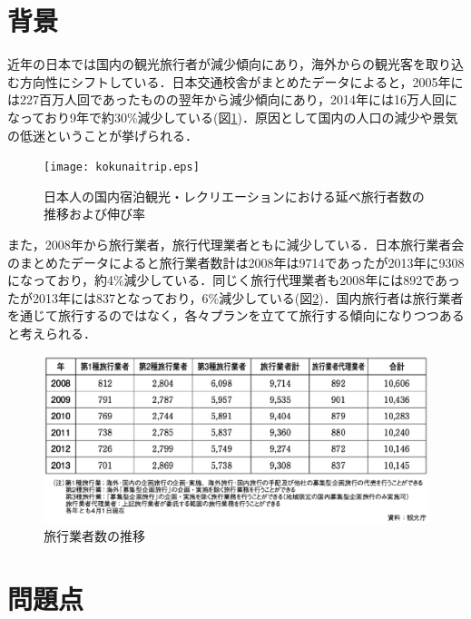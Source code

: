 \documentclass{funthesis}
\begin{document}

\section{背景}
近年の日本では国内の観光旅行者が減少傾向にあり，海外からの観光客を取り込む方向性にシフトしている．日本交通校舎がまとめたデータ\cite{kokunaitrip}によると，2005年には227百万人回であったものの翌年から減少傾向にあり，2014年には16万人回になっており9年で約30\%減少している(図\ref{kokunai})．原因として国内の人口の減少や景気の低迷ということが挙げられる．

\begin{figure}[htpb]
\begin{center}
\texttt{[image: kokunaitrip.eps]}
\end{center}
\caption{日本人の国内宿泊観光・レクリエーションにおける延べ旅行者数の推移および伸び率}
\label{kokunai}
\end{figure}

また，2008年から旅行業者，旅行代理業者ともに減少している．日本旅行業者会のまとめたデータ\cite{ryokougyokai}によると旅行業者数計は2008年は9714であったが2013年に9308になっており，約4\%減少している．同じく旅行代理業者も2008年には892であったが2013年には837となっており，6\%減少している(図\ref{gyosya})．国内旅行者は旅行業者を通じて旅行するのではなく，各々プランを立てて旅行する傾向になりつつあると考えられる．

\begin{figure}[htpb]
\begin{center}
\includegraphics[scale=0.68]{tripgyosya.eps}
\end{center}
\caption{旅行業者数の推移}
\label{gyosya}
\end{figure}


\section{問題点} %
\end{document}
